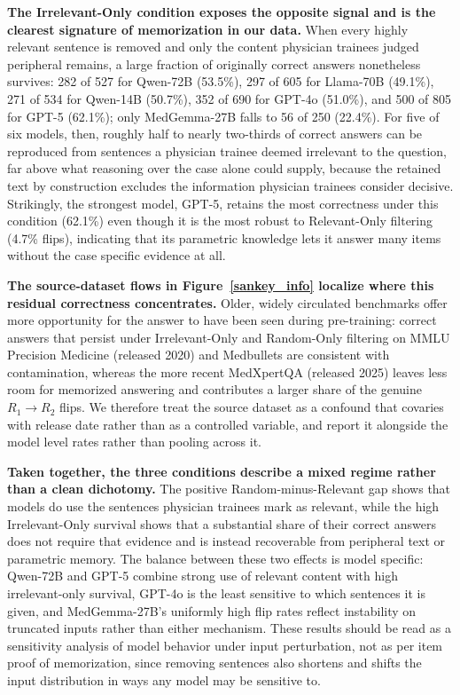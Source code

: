 \documentclass[fleqn,10pt]{wlscirep}
\begin{document}
\textbf{The Irrelevant-Only condition exposes the opposite signal and is the clearest signature of memorization in our data.} When every highly relevant sentence is removed and only the content physician trainees judged peripheral remains, a large fraction of originally correct answers nonetheless survives: 282 of 527 for Qwen-72B (53.5\%), 297 of 605 for Llama-70B (49.1\%), 271 of 534 for Qwen-14B (50.7\%), 352 of 690 for GPT-4o (51.0\%), and 500 of 805 for GPT-5 (62.1\%); only MedGemma-27B falls to 56 of 250 (22.4\%). For five of six models, then, roughly half to nearly two-thirds of correct answers can be reproduced from sentences a physician trainee deemed irrelevant to the question, far above what reasoning over the case alone could supply, because the retained text by construction excludes the information physician trainees consider decisive. Strikingly, the strongest model, GPT-5, retains the most correctness under this condition (62.1\%) even though it is the most robust to Relevant-Only filtering (4.7\% flips), indicating that its parametric knowledge lets it answer many items without the case specific evidence at all.

\textbf{The source-dataset flows in Figure~\ref{sankey_info} localize where this residual correctness concentrates.} Older, widely circulated benchmarks offer more opportunity for the answer to have been seen during pre-training: correct answers that persist under Irrelevant-Only and Random-Only filtering on MMLU Precision Medicine (released 2020) and Medbullets are consistent with contamination, whereas the more recent MedXpertQA (released 2025) leaves less room for memorized answering and contributes a larger share of the genuine $R_1\rightarrow R_2$ flips. We therefore treat the source dataset as a confound that covaries with release date rather than as a controlled variable, and report it alongside the model level rates rather than pooling across it.

\textbf{Taken together, the three conditions describe a mixed regime rather than a clean dichotomy.} The positive Random-minus-Relevant gap shows that models do use the sentences physician trainees mark as relevant, while the high Irrelevant-Only survival shows that a substantial share of their correct answers does not require that evidence and is instead recoverable from peripheral text or parametric memory. The balance between these two effects is model specific: Qwen-72B and GPT-5 combine strong use of relevant content with high irrelevant-only survival, GPT-4o is the least sensitive to which sentences it is given, and MedGemma-27B's uniformly high flip rates reflect instability on truncated inputs rather than either mechanism. These results should be read as a sensitivity analysis of model behavior under input perturbation, not as per item proof of memorization, since removing sentences also shortens and shifts the input distribution in ways any model may be sensitive to.
\end{document}
